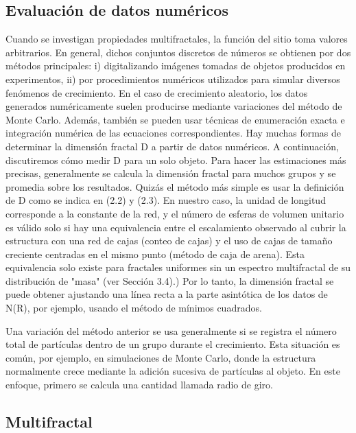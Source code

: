 \documentclass[11pt]{article}
\begin{document}
\subsection{Evaluación de datos numéricos}

Cuando se investigan propiedades multifractales, la función del sitio toma valores arbitrarios. En general, dichos conjuntos discretos de números se obtienen por dos métodos principales: i) digitalizando imágenes tomadas de objetos producidos en experimentos, ii) por procedimientos numéricos utilizados para simular diversos fenómenos de crecimiento. En el caso de crecimiento aleatorio, los datos generados numéricamente suelen producirse mediante variaciones del método de Monte Carlo. Además, también se pueden usar técnicas de enumeración exacta e integración numérica de las ecuaciones correspondientes. Hay muchas formas de determinar la dimensión fractal D a partir de datos numéricos. A continuación, discutiremos cómo medir D para un solo objeto. Para hacer las estimaciones más precisas, generalmente se calcula la dimensión fractal para muchos grupos y se promedia sobre los resultados. Quizás el método más simple es usar la definición de  D como se indica en (2.2) y (2.3). En nuestro caso, la unidad de longitud corresponde a la constante de la red, y el número de esferas de volumen unitario es válido solo si hay una equivalencia entre el escalamiento observado al cubrir la estructura con una red de cajas (conteo de cajas) y el uso de cajas de tamaño creciente centradas en el mismo punto (método de caja de arena). Esta equivalencia solo existe para fractales uniformes sin un espectro multifractal de su distribución de "masa" (ver Sección 3.4).) Por lo tanto, la dimensión fractal se puede obtener ajustando una línea recta a la parte asintótica de los datos de  N(R), por ejemplo, usando el método de mínimos cuadrados.

Una variación del método anterior se usa generalmente si se registra el número total de partículas dentro de un grupo durante el crecimiento. Esta situación es común, por ejemplo, en simulaciones de Monte Carlo, donde la estructura normalmente crece mediante la adición sucesiva de partículas al objeto. En este enfoque, primero se calcula una cantidad llamada radio de giro.

\subsection{Multifractal}
\end{document}
